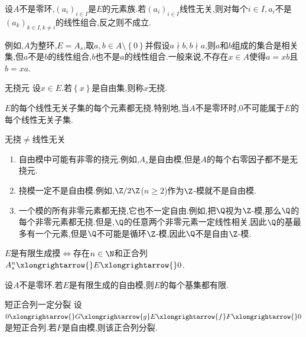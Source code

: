 \begin{remark}{}{}
	设$A$不是零环,$\left(a_{i}\right)_{i\in I}$是$E$的元素族.若$\left(a_{i}\right)_{i\in I}$线性无关,则对每个$i\in I,a_{i}$不是$\left(a_{k}\right)_{k\in I,k\neq i}$的线性组合,反之则不成立.
	
	例如,$A$为整环,$E=A_{s}$,取$a,b\in A\setminus\left\{0\right\}$并假设$a\nmid b,b\nmid a$,则$a$和$b$组成的集合是相关集,但$a$不是$b$的线性组合,$b$也不是$a$的线性组合.一般来说,不存在$x\in A$使得$a=xb$且$b=xa$.
\end{remark}

\begin{definition}{无挠元}{}
	设$x\in E$.若$\left\{x\right\}$是自由集,则称$x$无挠.
\end{definition}

\begin{proposition}{}{}
	$E$的每个线性无关子集的每个元素都无挠.特别地,当$A$不是零环时,$0$不可能属于$E$的每个线性无关子集.
\end{proposition}

\begin{remark}{无挠$\neq$线性无关}{}
	\begin{enumerate}
		\item 自由模中可能有非零的挠元.例如,$A_{s}$是自由模,但是$A$的每个右零因子都不是无挠元.
		\item 挠模一定不是自由模.例如,$\Z/2\Z$($n\geq 2$)作为$\Z$-模就不是自由模.
		\item 一个模的所有非零元素都无挠,它也不一定自由.例如,把$\Q$视为$\Z$-模,那么$\Q$的每个非零元素都无挠.但是,$\Q$的任意两个非零元素一定线性相关,因此$\Q$的基最多有一个元素,但是$\Q$不可能是循环$\Z$-模,因此$\Q$不是自由$\Z$-模.
	\end{enumerate}
\end{remark}

\begin{proposition}{}{}
	$E$是有限生成摸$\iff$存在$n\in\N$和正合列$A_{s}^{n}\xlongrightarrow{}E\xlongrightarrow{}0$.
\end{proposition}

\begin{proposition}{}{}
	设$A$不是零环.若$E$是有限生成的自由模,则$E$的每个基集都有限.
\end{proposition}

\begin{theorem}{短正合列一定分裂}{}
	设$0\xlongrightarrow{}G\xlongrightarrow{g}E\xlongrightarrow{f}F\xlongrightarrow{}0$是短正合列.若$F$是自由模,则该正合列分裂.
\end{theorem}

